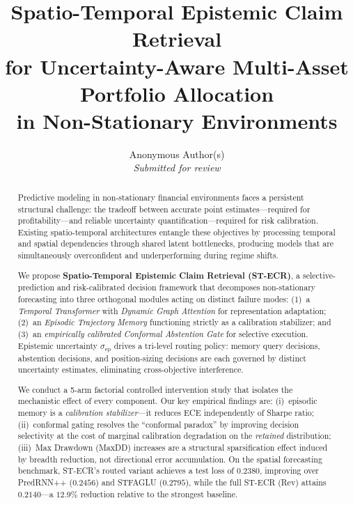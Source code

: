 \documentclass[11pt,a4paper]{article}
\title{%
  \textbf{Spatio-Temporal Epistemic Claim Retrieval}\\[4pt]
  \large for Uncertainty-Aware Multi-Asset Portfolio Allocation\\
  in Non-Stationary Environments
}
\author{%
  Anonymous Author(s)\\[4pt]
  \normalsize \textit{Submitted for review}
}
\date{}
\newcommand{\sep}{\sigma_{\mathrm{ep}}}
\begin{document}
\maketitle
\thispagestyle{empty}

\begin{abstract}
Predictive modeling in non-stationary financial environments faces a persistent
structural challenge: the tradeoff between accurate point estimates—required for
profitability—and reliable uncertainty quantification—required for risk calibration.
Existing spatio-temporal architectures entangle these objectives by processing
temporal and spatial dependencies through shared latent bottlenecks, producing
models that are simultaneously overconfident and underperforming during
regime shifts.

We propose \textbf{Spatio-Temporal Epistemic Claim Retrieval (ST-ECR)}, a
selective-prediction and risk-calibrated decision framework that decomposes
non-stationary forecasting into three orthogonal modules acting on distinct
failure modes: (1)~a \emph{Temporal Transformer} with \emph{Dynamic Graph
Attention} for representation adaptation; (2)~an \emph{Episodic Trajectory
Memory} functioning strictly as a calibration stabilizer; and (3)~an
\emph{empirically calibrated Conformal Abstention Gate} for selective execution.
Epistemic uncertainty $\sep$ drives a tri-level routing policy: memory query
decisions, abstention decisions, and position-sizing decisions are each governed
by distinct uncertainty estimates, eliminating cross-objective interference.

We conduct a 5-arm factorial controlled intervention study that isolates the
mechanistic effect of every component.  Our key empirical findings are:
(i)~episodic memory is a \emph{calibration stabilizer}—it reduces ECE
independently of Sharpe ratio;
(ii)~conformal gating resolves the ``conformal paradox'' by improving decision
selectivity at the cost of marginal calibration degradation on the
\emph{retained} distribution;
(iii)~Max Drawdown (MaxDD) increases are a structural sparsification effect
induced by breadth reduction, not directional error accumulation.
On the spatial forecasting benchmark, ST-ECR's routed variant achieves
a test loss of $0.2380$, improving over PredRNN++ ($0.2456$) and STFAGLU
($0.2795$), while the full ST-ECR (Rev) attains $0.2140$—a $12.9\%$
reduction relative to the strongest baseline.
\end{abstract}
\end{document}
